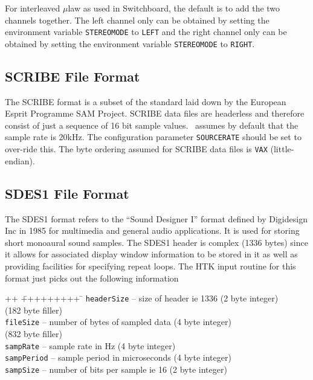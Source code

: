 For interleaved $\mu$law as used in Switchboard, the default is to add the two
channels together.  The left channel only can be obtained by setting the
environment variable \texttt{STEREOMODE} to \texttt{LEFT} and the right channel
only can be obtained by setting the environment variable \texttt{STEREOMODE} to
\texttt{RIGHT}.   

\subsection{SCRIBE File Format}

The SCRIBE format is a subset of the standard laid down by the European Esprit
Programme SAM Project.  SCRIBE data files are headerless and therefore consist
of just a sequence of 16 bit sample values.  \HTK\ assumes by default that the
sample rate is 20kHz.  The configuration parameter \texttt{SOURCERATE} should
be set to over-ride this.  The byte ordering assumed for SCRIBE data files is
\texttt{VAX} (little-endian).

\subsection{SDES1 File Format}

The SDES1 format refers to the ``Sound Designer I'' format defined by
Digidesign Inc in 1985 for multimedia and general audio applications.  It is
used for storing short monoaural sound samples.  The SDES1 header is complex
(1336 bytes) since it allows for associated display window information to be
stored in it as well as providing facilities for specifying repeat loops.  The
HTK input routine for this format just picks out the following information
\begin{tabbing}
++ \= +++++++++ \= \kill
\>\texttt{headerSize}  \>-- size of header ie 1336 (2 byte integer) \\
\>(182 byte filler) \\
\>\texttt{fileSize} \>-- number of bytes of sampled data (4 byte integer)\\
\>(832 byte filler) \\
\>\texttt{sampRate} \>-- sample rate in Hz (4 byte integer) \\
\>\texttt{sampPeriod} \>-- sample period in microseconds (4 byte integer) \\ 
\>\texttt{sampSize} \>-- number of bits per sample ie 16 (2 byte integer)
\end{tabbing}


